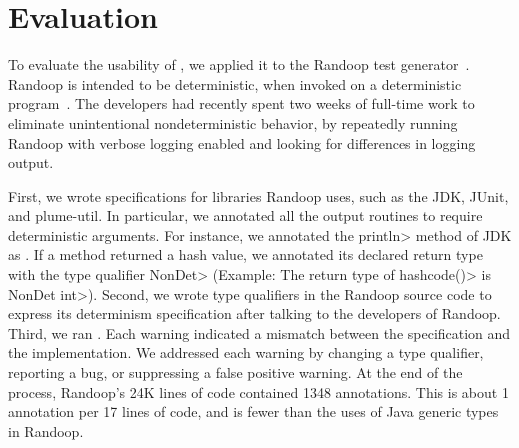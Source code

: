 \section{Evaluation\label{sec:results}}
To evaluate the usability of \theDeterminismChecker,
we applied it to the Randoop test
generator~\cite{PachecoLEB2007}.
Randoop is intended to be deterministic, when invoked on a deterministic
program~\cite{randoop-manual}.
The developers had recently
spent two weeks of full-time work to
eliminate unintentional nondeterministic behavior, by repeatedly
running Randoop with verbose logging enabled and
looking for differences in logging output.

First, we wrote specifications for libraries Randoop uses, such as the JDK,
JUnit, and plume-util. In particular, we annotated all the output routines to require deterministic
arguments. For instance, we annotated the \<println> method of JDK as
. If a method returned a hash value,
we annotated its declared return type with the type qualifier \<NonDet> (Example: The return type of
\<hashcode()> is \<NonDet int>). 
Second, we wrote type qualifiers in the Randoop source code to express its
determinism specification after talking to the developers of Randoop. 
Third, we ran
\theDeterminismChecker.  Each warning indicated a mismatch between the
specification and the implementation.  We addressed each warning by changing a
type qualifier, reporting a bug, or suppressing a false positive warning.
At the end of the process, Randoop's 24K lines of code contained 1348 annotations.
This is about 1 annotation per 17 lines of code,
and is fewer than the uses
of Java generic types in Randoop.

